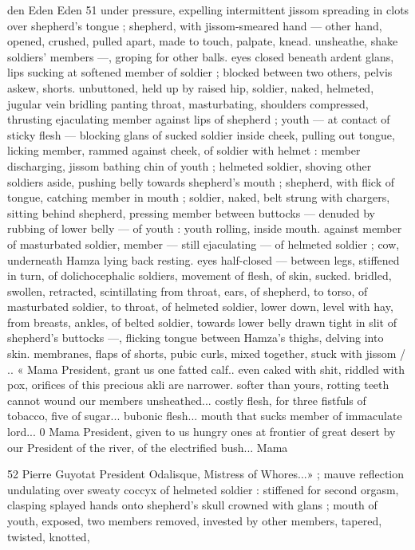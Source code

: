 den Eden Eden 51
under pressure, expelling intermittent jissom spreading in clots over
shepherd's tongue ; shepherd, with jissom-smeared hand — other
hand, opened, crushed, pulled apart, made to touch, palpate, knead.
unsheathe, shake soldiers’ members —, groping for other balls.
eyes closed beneath ardent glans, lips sucking at softened member
of soldier ; blocked between two others, pelvis askew, shorts.
unbuttoned, held up by raised hip, soldier, naked, helmeted, jugular
vein bridling panting throat, masturbating, shoulders compressed,
thrusting ejaculating member against lips of shepherd ; youth — at
contact of sticky flesh — blocking glans of sucked soldier inside
cheek, pulling out tongue, licking member, rammed against cheek, of
soldier with helmet : member discharging, jissom bathing chin of
youth ; helmeted soldier, shoving other soldiers aside, pushing belly
towards shepherd's mouth ; shepherd, with flick of tongue, catching
member in mouth ; soldier, naked, belt strung with chargers, sitting
behind shepherd, pressing member between buttocks — denuded
by rubbing of lower belly — of youth : youth rolling, inside mouth.
against member of masturbated soldier, member — still ejaculating
— of helmeted soldier ; cow, underneath Hamza lying back resting.
eyes half-closed — between legs, stiffened in turn, of
dolichocephalic soldiers, movement of flesh, of skin, sucked.
bridled, swollen, retracted, scintillating from throat, ears, of
shepherd, to torso, of masturbated soldier, to throat, of helmeted
soldier, lower down, level with hay, from breasts, ankles, of belted
soldier, towards lower belly drawn tight in slit of shepherd's buttocks
—, flicking tongue between Hamza’s thighs, delving into skin.
membranes, flaps of shorts, pubic curls, mixed together, stuck with
jissom / .. « Mama President, grant us one fatted calf.. even caked
with shit, riddled with pox, orifices of this precious akli are narrower.
softer than yours, rotting teeth cannot wound our members
unsheathed... costly flesh, for three fistfuls of tobacco, five of
sugar... bubonic flesh... mouth that sucks member of immaculate
lord... 0 Mama President, given to us hungry ones at frontier of great
desert by our President of the river, of the electrified bush... Mama

52 Pierre Guyotat
President Odalisque, Mistress of Whores...» ; mauve reflection
undulating over sweaty coccyx of helmeted soldier : stiffened for
second orgasm, clasping splayed hands onto shepherd's skull
crowned with glans ; mouth of youth, exposed, two members
removed, invested by other members, tapered, twisted, knotted,

